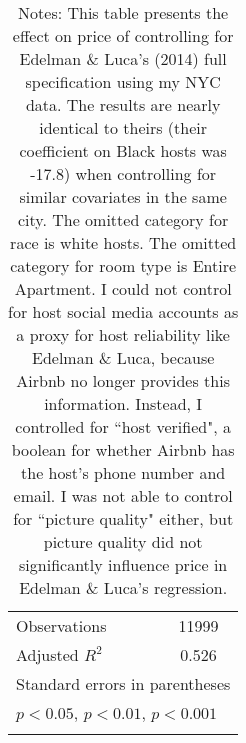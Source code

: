 {\begin{longtable}{l*{1}{c}}
\hline
Observations        &       11999         \\
Adjusted \(R^{2}\)  &       0.526         \\
\hline\hline
\multicolumn{2}{l}{\footnotesize Standard errors in parentheses}\\
\multicolumn{2}{l}{\footnotesize \sym{*} \(p<0.05\), \sym{**} \(p<0.01\), \sym{***} \(p<0.001\)}\\
\caption*{\footnotesize Notes: This table presents the effect on price of controlling for Edelman \& Luca's (2014) full specification using my NYC data. The results are nearly identical to theirs (their coefficient on Black hosts was -17.8) when controlling for similar covariates in the same city. The omitted category for race is white hosts. The omitted category for room type is Entire Apartment. I could not control for host social media accounts as a proxy for host reliability like Edelman \& Luca, because Airbnb no longer provides this information. Instead, I controlled for ``host verified", a boolean for whether Airbnb has the host's phone number and email. I was not able to control for ``picture quality" either, but picture quality did not significantly influence price in Edelman \& Luca's regression.}\\
\end{longtable}
}


